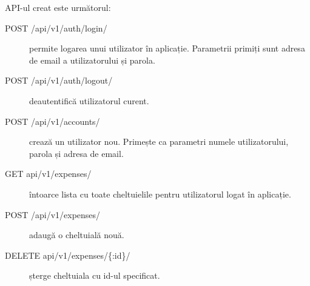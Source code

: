 API-ul creat este următorul:
\begin{description}
\item [POST /api/v1/auth/login/] permite logarea unui
utilizator în aplicație. Parametrii primiți sunt
adresa de email a utilizatorului și parola.
\item [POST /api/v1/auth/logout/] deautentifică
utilizatorul curent.
\item [POST /api/v1/accounts/] crează un utilizator nou.
Primește ca parametri numele utilizatorului, parola
și adresa de email.
\item [GET api/v1/expenses/] întoarce lista cu toate
cheltuielile pentru utilizatorul logat în aplicație.
\item [POST /api/v1/expenses/] adaugă o cheltuială
nouă.
\item [DELETE api/v1/expenses/\{:id\}/] șterge cheltuiala
cu id-ul specificat.
\end{description}